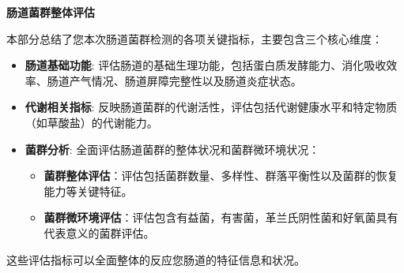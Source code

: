 \documentclass[UTF8]{ctexart}
\begin{document}
\newpage

\begin{tcolorbox}[
    enhanced,
    colback=white,
    colframe=customTeal,
    arc=2mm,
    boxrule=1pt,
    left=20pt,
    right=20pt,
    top=12pt,
    bottom=12pt,
    width=\textwidth,
    fontupper=\sffamily,
    overlay={
    \draw[customTeal, line width=2pt]
    ([xshift=15pt]frame.south west) -- ([xshift=-15pt]frame.south east);
    }
]
{\Large\bfseries\textcolor{customTeal}{\Huge 肠道菌群整体评估}}
\end{tcolorbox}

\begin{tcolorbox}[
    enhanced,
    colback=customTealBg,
    colframe=gray!5,
    arc=3mm,
    boxrule=0pt,
    width=\textwidth,
    top=8pt,
    bottom=8pt
]
{\footnotesize{\color{customTeal}
\faInfoCircle} 本部分总结了您本次肠道菌群检测的各项关键指标，主要包含三个核心维度：
\begin{itemize}
    \item \textbf{肠道基础功能}: 评估肠道的基础生理功能，包括蛋白质发酵能力、消化吸收效率、肠道产气情况、肠道屏障完整性以及肠道炎症状态。

    \item \textbf{代谢相关指标}: 反映肠道菌群的代谢活性，评估包括代谢健康水平和特定物质（如草酸盐）的代谢能力。

    \item \textbf{菌群分析}: 全面评估肠道菌群的整体状况和菌群微环境状况：
    \begin{itemize}
        \item \textbf{菌群整体评估}：评估包括菌群数量、多样性、群落平衡性以及菌群的恢复能力等关键特征。
        \item \textbf{菌群微环境评估}：评估包含有益菌，有害菌，革兰氏阴性菌和好氧菌具有代表意义的菌群评估。
    \end{itemize}
\end{itemize}
这些评估指标可以全面整体的反应您肠道的特征信息和状况。
}
\end{tcolorbox}
\end{document}
